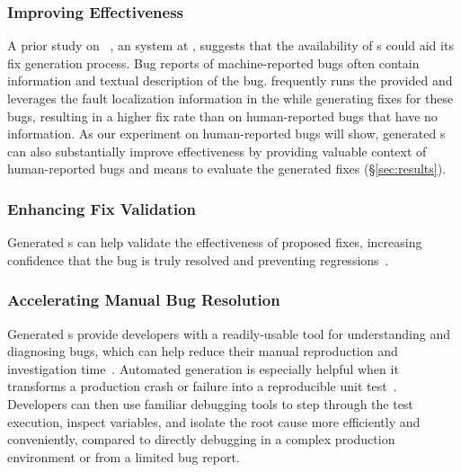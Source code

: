 \subsubsection{Improving \autopr Effectiveness}
A prior study on \passerine~\cite{rondon2025passerine}, an \autopr system at \google, suggests that the availability of \brt{}s could aid its fix generation process. 
Bug reports of machine-reported bugs often contain \brt information and textual description of the bug.
\passerine frequently runs the provided \brt and leverages the fault localization information in the \brt while generating fixes for these bugs, resulting in a higher fix rate than on human-reported bugs that have no \brt information.
As our experiment on human-reported bugs will show, generated \brt{}s can also substantially improve \autopr effectiveness by providing valuable context of human-reported bugs and  means to evaluate the generated fixes (\S\ref{sec:results}).


\subsubsection{Enhancing Fix Validation}
Generated \brt{}s can help validate the effectiveness of proposed fixes, increasing confidence that the bug is truly resolved and preventing regressions~\cite{mundler2024swt,kang2023large}.



\subsubsection{Accelerating Manual Bug Resolution}
Generated \brt{}s provide developers with a readily-usable tool for understanding and diagnosing bugs, which can help reduce their manual reproduction and investigation time~\cite{beller2018dichotomy}.
Automated \brt generation is especially helpful when it transforms a production crash or failure into a reproducible unit test~\cite{soltani2018single,nayrolles2015jcharming}.
Developers can then use familiar debugging tools to step through the test execution, inspect variables, and isolate the root cause more efficiently and conveniently, compared to directly debugging in a complex production environment or from a limited bug report.








